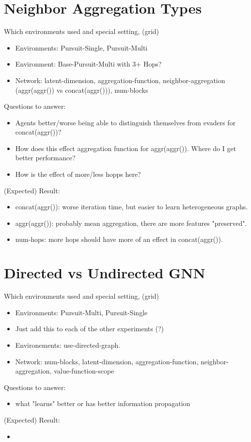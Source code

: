 \section{Neighbor Aggregation Types}
\label{sec:Neighbor Aggregation Types}
Which environments used and special setting, (grid)
\begin{itemize}[noitemsep,nolistsep]
    \item Environments: Pursuit-Single, Pursuit-Multi
    \item Environment: Base-Pursuit-Multi with 3+ Hops?
    \item Network: latent-dimension, aggregation-function, neighbor-aggregation (aggr(aggr()) vs concat(aggr())), num-blocks
\end{itemize}
Questions to answer:
\begin{itemize}[noitemsep,nolistsep]
    \item Agents better/worse being able to distinguish themselves from evaders for concat(aggr())?
    \item How does this effect aggregation function for aggr(aggr()). Where do I get better performance?
    \item How is the effect of more/less hopps here?
\end{itemize}
(Expected) Result:
\begin{itemize}[noitemsep,nolistsep]
    \item concat(aggr()): worse iteration time, but easier to learn heterogeneous graphs.
    \item aggr(aggr()): probably mean aggregation, there are more features "preserved".
    \item num-hops: more hops should have more of an effect in concat(aggr()).
\end{itemize}



\section{Directed vs Undirected GNN}
\label{sec:Directed vs Undirected GNN}
Which environments used and special setting, (grid)
\begin{itemize}[noitemsep,nolistsep]
    \item Environments: Pursuit-Multi, Pursuit-Single
    \item Just add this to each of the other experiments (?)
    \item Environements: use-directed-graph.
    \item Network: num-blocks, latent-dimension, aggregation-function, neighbor-aggregation, value-function-scope
\end{itemize}
Questions to answer:
\begin{itemize}[noitemsep,nolistsep]
    \item what "learns" better or has better information propagation
\end{itemize}
(Expected) Result:
\begin{itemize}[noitemsep,nolistsep]
    \item 
\end{itemize}



